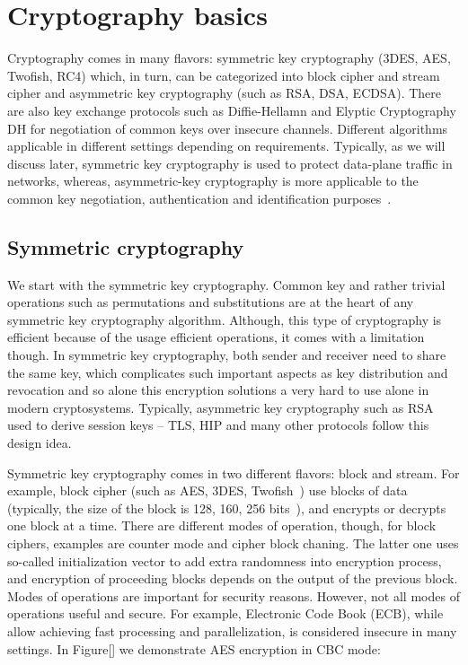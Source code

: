 \section{Cryptography basics}

Cryptography comes in many flavors: symmetric key cryptography 
(3DES, AES, Twofish, RC4) which, in turn, can be categorized into 
block cipher and stream cipher and asymmetric key cryptography 
(such as RSA, DSA, ECDSA). There are also key exchange protocols 
such as Diffie-Hellamn and Elyptic Cryptography DH for negotiation 
of common keys over insecure channels. Different algorithms applicable 
in different settings depending on requirements. Typically, as we will 
discuss later, symmetric key cryptography is used to protect 
data-plane traffic in networks, whereas, asymmetric-key cryptography is 
more applicable to the common key negotiation, authentication and 
identification purposes~\cite{Stinson:Cryptography}.

\subsection{Symmetric cryptography}

We start with the symmetric key cryptography. Common key and rather 
trivial operations such as permutations and substitutions are at the 
heart of any symmetric key cryptography algorithm. Although, this type 
of cryptography is efficient because of the usage efficient operations, 
it comes with a limitation though. In symmetric key cryptography, 
both sender and receiver need to share the same key, which complicates 
such important aspects as key distribution and revocation and so alone 
this encryption solutions a very hard to use alone in modern cryptosystems. 
Typically, asymmetric key cryptography such as RSA used to derive session 
keys – TLS, HIP and many other protocols follow this design idea.

Symmetric key cryptography comes in two different flavors: block and stream. 
For example, block cipher (such as AES, 3DES, Twofish~\cite{Stinson:Cryptography}) 
use blocks of data (typically, the size of the block is 128, 160, 256 
bits~\cite{Stinson:Cryptography}), and encrypts or 
decrypts one block at a time. There are different modes of operation, though, 
for block ciphers, examples are counter mode and cipher block chaning. The latter 
one uses so-called initialization vector to add extra randomness into encryption 
process, and encryption of proceeding blocks depends on the output of the previous 
block. Modes of operations are important for security reasons. However, not all 
modes of operations useful and secure. For example, Electronic Code Book (ECB), 
while allow achieving fast processing and parallelization, is considered insecure in 
many settings. In Figure[] we demonstrate AES encryption in CBC mode:


